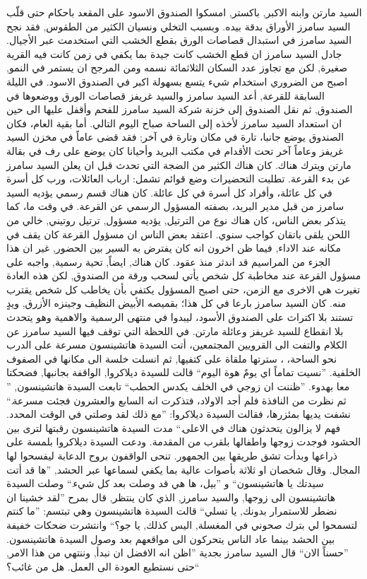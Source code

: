 \documentclass[12pt, a4paper]{article}
\begin{document}
\begin{otherlanguage}{arabic}
السيد مارتن وابنه الاكبر, باكستر, امسكوا الصندوق الاسود على المقعد باحكام حتى قلّب السيد سامرز الأوراق بدقة بيده.
وبسبب التخلي ونسيان الكثير من الطقوس, فقد نجح السيد سامرز في استبدال قصاصات الورق بقطع الخشب التي استخدمت عبر الأجيال.
جادل السيد سامرز ان قطع الخشب كانت جيدة بما يكفي في زمن كانت فيه القرية صغيرة,  لكن مع تجاوز عدد السكان الثلاثمائة 
نسمه ومن المرجح ان يستمر في النمو,  اصبح من الضروري استخدام شيء يتسع بسهولة اكبر في الصندوق الاسود. في الليلة السابقة
للقرعة, أعد السيد سامرز والسيد غريفز قصاصات الورق ووضعوها في الصندوق, ثم نقل الصندوق إلى خزنة شركة السيد سامرز للفحم 
وأقفل عليها الى حين ان استعداد  السيد سامرز لأخذه إلى الساحة صباح اليوم التالي. أما بقية العام، فكان الصندوق يوضع 
جانبا، تارة في مكان وتارة في آخر; فقد قضى عاماً  في مخزن السيد غريفز وعاماً  آخر تحت الأقدام في مكتب البريد وأحيانا 
كان يوضع على رف في بقالة مارتن ويترك هناك. كان هناك الكثير من الضجة التي تحدث قبل ان يعلن السيد سامرز عن بدء القرعة.
تطلبت التحضيرات وضع قوائم تشمل: ارباب العائلات، ورب كل أسرة في كل عائلة، وأفراد كل أسرة في كل عائلة.
كان هناك قسم رسمي يؤديه السيد سامرز من قبل مدير البريد، بصفته المسؤول الرسمي عن القرعة. في وقت ما، كما يتذكر بعض 
الناس، كان هناك نوع من الترتيل, يؤديه مسؤول, ترتيل روتيني, خالي من اللحن يلقى باتقان كواجب سنوي.
اعتقد بعض الناس ان مسؤول القرعة كان يقف في مكانه عند الاداء, فيما ظن اخرون انه كان يفترض به السير بين الحضور,
غير ان هذا الجزء من المراسيم قد اندثر منذ عقود. كان هناك, ايضاً, تحية رسمية, واجبه على مسؤول القرعة عند مخاطبة كل شخص
يأتي لسحب ورقة من الصندوق, لكن هذه العادة تغيرت هي الاخرى مع الزمن، حتى اصبح المسؤول يكتفي بأن يخاطب كل شخص يقترب منه.
كان السيد سامرز بارعا في كل هذا؛ بقميصه الأبيض النظيف وجينزه الأزرق, ويدٍ تستند بلا اكتراث على الصندوق الأسود، 
ليبدوا في منتهى الرسمية والاهمية وهو يتحدث بلا انقطاع للسيد غريفز وعائلة مارتن. في اللحظة التي توقف فيها السيد 
سامرز عن الكلام والتفت الى القرويين المجتمعين، أتت السيدة هاتشينسون مسرعة على الدرب نحو الساحة، ، سترتها ملقاة على 
كتفيها, ثم انسلت خلسة الى مكانها في الصفوف الخلفية. ”نسيت تماماً اي يومٌ هوة اليوم“ قالت للسيدة ديلاكروا, الواقفة بجانبها,
فضحكتا معا بهدوء. ”ظننت ان زوجي في الخلف يكدس الحطب“ تابعت السيدة هاتشينسون, ” ثم نظرت من النافذة فلم أجد الاولاد، 
فتذكرت انه السابع والعشرون فجئت مسرعة.“  نشفت يديها بمئزرها، فقالت السيدة ديلاكروا: ”مع ذلك لقد وصلتي في الوقت المحدد.
فهم لا يزالون يتحدثون هناك في الاعلى.“ مدت السيدة هاتشينسون رقبتها لترى بين الحشود فوجدت زوجها واطفالها بلقرب من المقدمة.
ودعت السيدة ديلاكروا بلمسة على ذراعها وبدأت تشق طريقها بين الجمهور. تنحى الواقفون بروح الدعابة ليفسحوا لها المجال.
وقال شخصان او ثلاثة بأصوات عالية بما يكفي لسماعها عبر الحشد, ”ها قد أتت سيدتك يا هاتشينسون“ و 
”بيل، ها هي قد وصلت بعد كل شيء.“ وصلت السيدة هاتشينسون الى زوجها, والسيد سامرز, الذي كان ينتظر, قال بمرح 
”لقد خشينا ان نضطر للاستمرار بدونك, يا تسلي“ قالت السيدة هاتشينسون وهي تبتسم: ”ما كنتم لتسمحوا لي بترك صحوني في 
المغسلة,  اليس كذلك, يا جو؟“  وانتشرت ضحكات خفيفة بين الحشد بينما عاد الناس يتحركون الى مواقعهم بعد وصول السيدة هاتشينسون.
”حسناً الان“ قال السيد سامرز بجدية ”اظن انه الافضل ان نبدأ, وننتهي من هذا الامر, حتى نستطيع العودة الى العمل. هل من غائب؟“









\end{otherlanguage}
  
\end{document}
